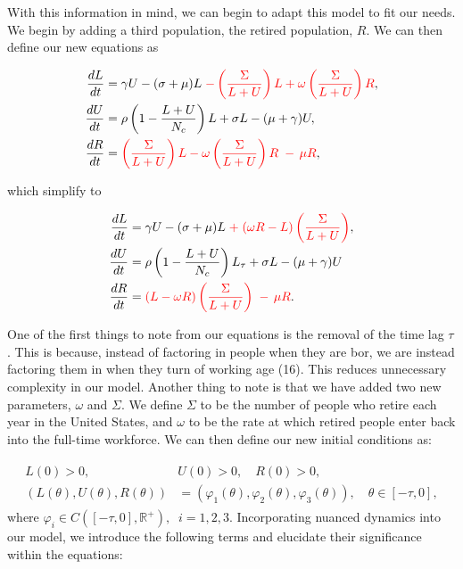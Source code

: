 \documentclass{article}
\begin{document}
With this information in mind, we can begin to adapt this model to fit our needs. We begin by adding a third population, the retired population, $R$.
We can then define our new equations as

\begin{align}
    \begin{split}
        \frac{dL}{dt} &= \gamma U - (\sigma + \mu)L {\color{red}\;- \left(\frac{\Sigma}{L + U}\right) L + \omega\left(\frac{\Sigma}{L + U}\right) R},\\
        \frac{dU}{dt} &= \rho\left(1 - \frac{L + U}{N_c} \right)L + \sigma L -(\mu + \gamma)U,  \\
        \frac{dR}{dt} &= {\color{red}\left(\frac{\Sigma}{L + U}\right) L - \omega\left(\frac{\Sigma}{L + U}\right) R \; - \, \mu R},
    \end{split}
\end{align}

which simplify to 

\begin{align}
    \begin{split}
        \frac{dL}{dt} &= \gamma U - (\sigma + \mu)L {\color{red}\; + \;(\omega R - L)\left(\frac{\Sigma}{L + U}\right)},\\
        \frac{dU}{dt} &= \rho\left(1 - \frac{L + U}{N_c} \right)L_{\tau} + \sigma L -(\mu + \gamma)U  \\
        \frac{dR}{dt} &= {\color{red}(L - \omega R)\left(\frac{\Sigma}{L + U}\right) \; - \, \mu R}.
    \end{split}
\end{align}

One of the first things to note from our equations is the removal of the time lag $\tau$. 
This is because, instead of factoring in people when they are bor, we are instead factoring them
in when they turn of working age (16). This reduces unnecessary complexity in our model. Another thing to note
is that we have added two new parameters, $\omega$ and $\Sigma$. We define $\Sigma$ to be the number of people who
retire each year in the United States, and $\omega$ to be the rate at which retired people enter back
into the full-time workforce. We can then define our new initial conditions as:

\begin{align}
    \begin{split}
        L(0) > 0, \quad &U(0) > 0, \quad R(0) > 0, \\
        (L(\theta),U(\theta), R(\theta)) &= (\varphi_1(\theta), \varphi_2(\theta), \varphi_3(\theta)), \quad \theta \in [-\tau,0],
    \end{split}
\end{align}
where $\varphi_i\in C([-\tau, 0], \mathbb{R}^+),\;\; i=1,2,3$. Incorporating nuanced dynamics into our model, we introduce the following terms and elucidate their significance within the equations:
\end{document}
